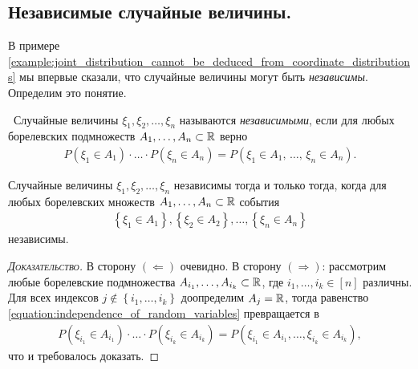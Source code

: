 \documentclass[../main.tex]{subfiles}
\begin{document}
\subsection{Независимые случайные величины.}

В примере \ref{example:joint_distribution_cannot_be_deduced_from_coordinate_distributions} мы впервые сказали, что случайные величины могут быть \textit{независимы}. Определим это понятие.

\begin{df}\
 Случайные величины $ \xi_1, \xi_2, \ldots, \xi_n$ называются \textit{независимыми}, если для любых борелевских подмножеств $ A_1, \ldots, A_n \subset \mathbb{R} $ верно
 \begin{align}
  \label{equation:independence_of_random_variables}
  P(\xi_1 \in A_1) \cdot \ldots \cdot P(\xi_n \in A_n) = P(\xi_1 \in A_1,\, \ldots,\, \xi_n \in A_n).
 \end{align}
\end{df}
\begin{claim}
 Случайные величины $ \xi_1, \xi_2, \ldots, \xi_n $ независимы тогда и только тогда, когда для любых борелевских множеств $ A_1, \ldots, A_n \subset \mathbb{R} $ события
 \begin{align*}
  \left\{\xi_1 \in A_1\right\}, \left\{ \xi_2 \in A_2 \right\}, \ldots, \left\{\xi_n \in A_n\right\}
 \end{align*}
 независимы.
\end{claim}
\begin{proof}[\normalfont\textsc{Доказательство}]
 В сторону $(\Longleftarrow)$ очевидно. В сторону $(\Longrightarrow)$: рассмотрим любые борелевские подмножества $ A_{i_1}, \ldots, A_{i_k} \subset \mathbb{R} $, где $ i_1, \ldots, i_k \in [n] $ различны. Для всех индексов $ j \notin \left\{ i_1, \ldots, i_k \right\} $ доопределим $ A_j = \mathbb{R} $, тогда равенство \eqref{equation:independence_of_random_variables} превращается в
 \begin{align*}
  P(\xi_{i_1} \in A_{i_1}) \cdot \ldots \cdot P(\xi_{i_k} \in A_{i_k}) = P(\xi_{i_1} \in A_{i_1}, \ldots, \xi_{i_k} \in A_{i_k}),
 \end{align*} что и требовалось доказать.
\end{proof}
\end{document}

